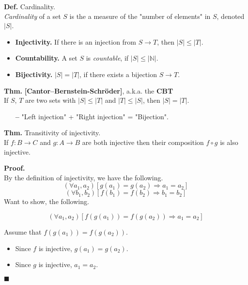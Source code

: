 \documentclass{article}
\newenvironment{regdef}[2][Def.]
    { \begin{mdframed}[backgroundcolor=yellow!10] \textbf{#1} {#2}. \vspace{0.05cm}\\}
    {  \end{mdframed}}
\newenvironment{theorem}[2][Thm.]
    { \begin{mdframed}[backgroundcolor=blue!10] \textbf{#1} {#2} \vspace{0.2cm}\\}
    {  \end{mdframed}}
\newenvironment{prf}[2][Proof.]
    { \begin{mdframed}[] \textbf{#1 #2} \\}
    {  \end{mdframed}}
\newcommand{\N}{\mathbb{N}}
\newcommand{\ep}{\hfill $\blacksquare$\nl}
\begin{document}
    \begin{regdef}{Cardinality}
        \textit{Cardinality} of a set $S$ is the a measure of the "number of elements" in $S$, denoted $|S|$.
        \begin{itemize}
            \item \textbf{Injectivity.} If there is an injection from $S\to T$, then $|S| \le |T|$.
            \item \textbf{Countability.} A set $S$ is \textit{countable}, if $|S| \le |\N|$.
            \item \textbf{Bijectivity.} $|S| = |T|$, if there exists a bijection $S\to T$.
        \end{itemize}
    \end{regdef}
    
    \begin{theorem}{\textbf{[Cantor–Bernstein-Schröder]}, a.k.a. the \textbf{CBT}}
        If $S$, $T$ are two sets with $|S| \le |T|$ and $|T| \le |S|$, then $|S| = |T|$.
        \begin{itemize}
            \item[\textbf{--}] "Left injection" + "Right injection" = "Bijection".
        \end{itemize}
    \end{theorem}
    
    \clearpage
    
    \begin{theorem}{Transitivity of injectivity.}
        If $f: B\to C$ and $g: A\to B$ are both injective then their composition $f \circ g$ is also injective.
    \end{theorem}
    \begin{prf}{}
        By the definition of injectivity, we have the following.
        \[(\forall a_1, a_2)[g(a_1) = g(a_2) \Rightarrow a_1 = a_2]\]
        \[(\forall b_1, b_2)[f(b_1) = f(b_2) \Rightarrow b_1 = b_2]\]
        Want to show, the following.
        
        \[(\forall a_1, a_2)[f(g(a_1)) = f(g(a_2)) \Rightarrow a_1 = a_2]\]
        
        Assume that $f(g(a_1)) = f(g(a_2))$. 
        \begin{itemize}
            \item Since $f$ is injective, $g(a_1) = g(a_2)$. 
            \item Since $g$ is injective, $a_1 = a_2$.
        \end{itemize} \ep
    \end{prf}
    
\end{document}
